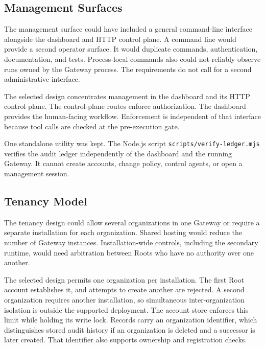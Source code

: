 \subsection{Management Surfaces}
\label{sec:gov-management-surfaces}

{\color{red}The management surface could have included a general command-line
interface alongside the dashboard and HTTP control plane. A command line would
provide a second operator surface. It would duplicate commands, authentication,
documentation, and tests. Process-local commands also could not reliably
observe runs owned by the Gateway process. The requirements do not call for a
second administrative interface.

The selected design concentrates management in the dashboard and its HTTP
control plane. The control-plane routes enforce authorization. The
dashboard provides the human-facing workflow. Enforcement is independent of
that interface because tool calls are checked at the pre-execution gate.

One standalone utility was kept. The Node.js script
\texttt{scripts/verify-ledger.mjs} verifies the audit ledger independently of
the dashboard and the running Gateway. It cannot create accounts, change
policy, control agents, or open a management session.}

\subsection{Tenancy Model}
\label{sec:gov-tenancy-model}

{\color{red}The tenancy design could allow several organizations in one Gateway or
require a separate installation for each organization. Shared hosting would
reduce the number of Gateway instances. Installation-wide controls,
including the secondary runtime, would need arbitration between Roots who have
no authority over one another.

The selected design permits one organization per installation. The first Root
account establishes it, and attempts to create another are rejected. A second
organization requires another installation, so simultaneous inter-organization
isolation is outside the supported deployment. The account store enforces this
limit while holding its write lock. Records carry an organization identifier,
which distinguishes stored audit history if an organization is deleted and a
successor is later created. That identifier also supports ownership and
registration checks.}

